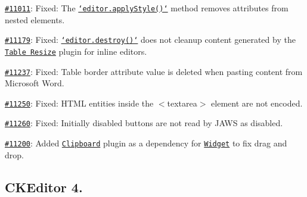 \begin{DoxyItemize}
\item \href{http://dev.ckeditor.com/ticket/11011}{\tt \#11011}\-: Fixed\-: The \href{http://docs.ckeditor.com/#!/api/CKEDITOR.editor-method-applyStyle}{\tt `editor.apply\-Style()`} method removes attributes from nested elements.
\item \href{http://dev.ckeditor.com/ticket/11179}{\tt \#11179}\-: Fixed\-: \href{http://docs.ckeditor.com/#!/api/CKEDITOR.editor-method-destroy}{\tt `editor.destroy()`} does not cleanup content generated by the \href{http://ckeditor.com/addon/tableresize}{\tt Table Resize} plugin for inline editors.
\item \href{http://dev.ckeditor.com/ticket/11237}{\tt \#11237}\-: Fixed\-: Table border attribute value is deleted when pasting content from Microsoft Word.
\item \href{http://dev.ckeditor.com/ticket/11250}{\tt \#11250}\-: Fixed\-: H\-T\-M\-L entities inside the {\ttfamily $<$textarea$>$} element are not encoded.
\item \href{http://dev.ckeditor.com/ticket/11260}{\tt \#11260}\-: Fixed\-: Initially disabled buttons are not read by J\-A\-W\-S as disabled.
\item \href{http://dev.ckeditor.com/ticket/11200}{\tt \#11200}\-: Added \href{http://ckeditor.com/addon/clipboard}{\tt Clipboard} plugin as a dependency for \href{http://ckeditor.com/addon/widget}{\tt Widget} to fix drag and drop.
\end{DoxyItemize}

\subsection*{C\-K\-Editor 4.}

